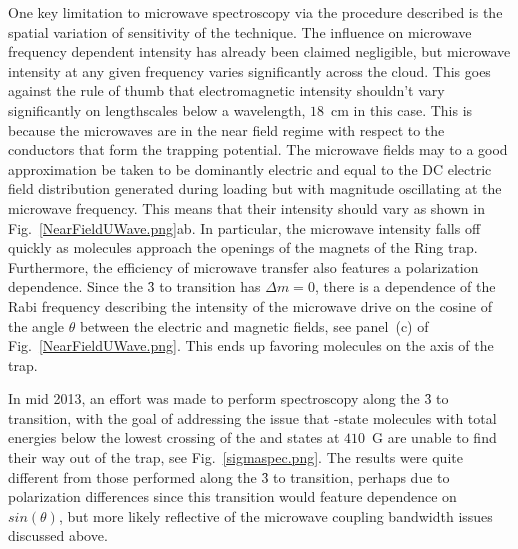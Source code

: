 One key limitation to microwave spectroscopy via the procedure described is the spatial variation of sensitivity of the technique.
The influence on microwave frequency dependent intensity has already been claimed negligible, but microwave intensity at any given frequency varies significantly across the cloud.
This goes against the rule of thumb that electromagnetic intensity shouldn't vary significantly on lengthscales below a wavelength, $18$~cm in this case.
This is because the microwaves are in the near field regime with respect to the conductors that form the trapping potential.
The microwave fields may to a good approximation be taken to be dominantly electric and equal to the DC electric field distribution generated during loading but with magnitude oscillating at the microwave frequency.
This means that their intensity should vary as shown in Fig.~\ref{NearFieldUWave.png}ab.
In particular, the microwave intensity falls off quickly as molecules approach the openings of the magnets of the Ring trap.
Furthermore, the efficiency of microwave transfer also features a polarization dependence.
Since the \f3 to  transition has $\Delta m=0$, there is a dependence of the Rabi frequency describing the intensity of the microwave drive on the cosine of the angle $\theta$ between the electric and magnetic fields, see panel~(c) of Fig.~\ref{NearFieldUWave.png}.
This ends up favoring molecules on the axis of the trap.


In mid 2013, an effort was made to perform spectroscopy along the \f3 to  transition, with the goal of addressing the issue that -state molecules with total energies below the lowest crossing of the  and  states at $410$~G are unable to find their way out of the trap, see Fig.~\ref{sigmaspec.png}.
The results were quite different from those performed along the \f3 to  transition, perhaps due to polarization differences since this transition would feature dependence on $sin(\theta)$, but more likely reflective of the microwave coupling bandwidth issues discussed above.

